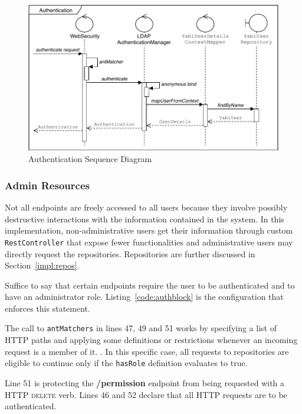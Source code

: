 \begin{figure}
  \centering
  \includegraphics[width=.9\textwidth]{images/diagramas/authentication}
  \caption{Authentication Sequence Diagram}\label{fig:authseq}
\end{figure}


\subsubsection{Admin Resources}\label{impl:admres}
Not all endpoints are freely accessed to all users because they involve possibly destructive interactions with the information contained in the system. In this implementation, non-administrative users get their information through custom \texttt{RestController} that expose fewer functionalities and administrative users may directly request the repositories. Repositories are further discussed in Section~\ref{impl:repos}.

Suffice to say that certain endpoints require the user to be authenticated and to have an administrator role. Listing~\ref{code:authblock} is the configuration that enforces this statement.

The call to \texttt{antMatchers} in lines 47, 49 and 51 works by specifying a list of \gls{HTTP} paths and applying some definitions or restrictions whenever an incoming request is a member of it. . In this specific case, all requests to repositories are eligible to continue only if the \texttt{hasRole} definition evaluates to true.

Line 51 is protecting the \textbf{/permission} endpoint from being requested with a \gls{HTTP} \textsc{delete} verb.
Lines 46 and 52 declare that all \gls{HTTP} requests are to be authenticated.



